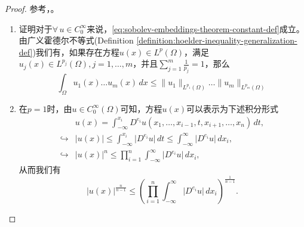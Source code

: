 \begin{proof}
  参考\cite[Theorem 1.4.6]{Brenner:2008hf}，\cite[Theorem 3.26]{McLean:2000ta}。

\begin{enumerate}

  \item 证明对于$\forall \, u \in C_0^{\infty}$来说，\eqref{eq:sobolev-embeddings-theorem-constant-def}成立。由广义霍德尔不等式(Definition \ref{definition:hoelder-inequality-generalization-def})我们有，如果存在方程$u(x) \in L^{p}(\Omega)$，满足$u_j(x) \in L^{p_j}(\Omega), j=1,\ldots,m$，并且$\sum_{j=1}^{m}\frac{1}{p_j} =1$，那么
\begin{equation}
  \label{eq:sobolev-embedding-theorem-generalize-hoelder-ineq}
  \int_{\Omega} u_1(x) \ldots u_m(x) \, dx \le \big\| u_1 \big\|_{L^{p_1} (\Omega)} \ldots \big\| u_m \big\|_{L^{p_m} (\Omega)}
\end{equation}

\item 在$p=1$时，由$u \in C_0^{\infty}(\Omega)$可知，方程$u(x)$可以表示为下述积分形式
\begin{equation*}
  \begin{split}
  &u(x) = \int_{-\infty}^{x_i} D^{e_i} u \left(
  x_1, \ldots, x_{i-1}, t, x_{i+1}, \ldots, x_n
  \right) \, dt, \\
  \hookrightarrow & \big| u(x) \big| \le \int_{-\infty}^{x_i} \big| D^{e_i} u \big| \, dt \le \int_{-\infty}^{\infty} \big| D^{e_i} u \big| \, d x_i, \\
  \hookrightarrow & \big| u(x) \big|^{n} \le \prod_{i=1}^{n} \int_{-\infty}^{\infty} \big| D^{e_i} u \big| \, d x_i,
\end{split}
\end{equation*}
从而我们有
\begin{equation}
  \label{eq:sobolev-embedding-ux-partial-n-1}
  \big| u(x) \big|^{\frac{n}{n-1}} \le \left(
  \prod_{i=1}^{n} \int_{-\infty}^{\infty} \big| D^{e_i} u \big| \, d x_i
  \right)^{\frac{1}{n-1}}.
\end{equation}


\end{enumerate}
\end{proof}
